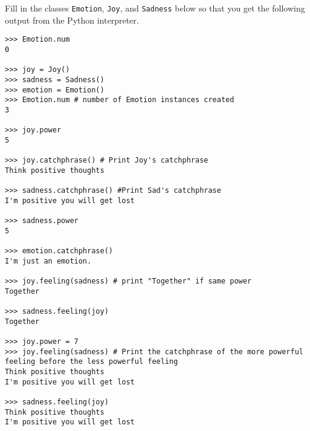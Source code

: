 \question
Fill in the classes \texttt{Emotion}, \texttt{Joy}, and \texttt{Sadness} below so that you get the following output from the Python interpreter.

\begin{blocksection}
\begin{lstlisting}
>>> Emotion.num
0

>>> joy = Joy()
>>> sadness = Sadness()
>>> emotion = Emotion()
>>> Emotion.num # number of Emotion instances created
3

>>> joy.power
5

>>> joy.catchphrase() # Print Joy's catchphrase
Think positive thoughts

>>> sadness.catchphrase() #Print Sad's catchphrase
I'm positive you will get lost

>>> sadness.power
5

>>> emotion.catchphrase()
I'm just an emotion.

>>> joy.feeling(sadness) # print "Together" if same power
Together

>>> sadness.feeling(joy)
Together

>>> joy.power = 7
>>> joy.feeling(sadness) # Print the catchphrase of the more powerful feeling before the less powerful feeling
Think positive thoughts
I'm positive you will get lost

>>> sadness.feeling(joy)
Think positive thoughts 
I'm positive you will get lost
\end{lstlisting}
\end{blocksection}

